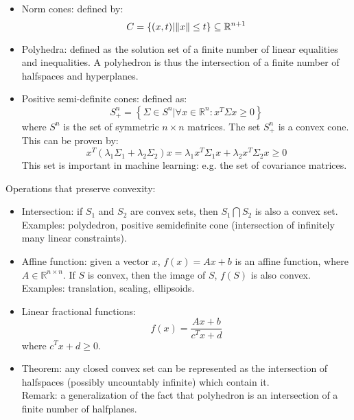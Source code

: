 \documentclass{report}
\begin{document}
\begin{itemize}
\item Norm cones: defined by: 
\begin{equation}
C	= \left\{(x,t) | \lVert x\rVert \leq t \right\} \subseteq \mathbb{R}^{n+1}
\end{equation}

\item Polyhedra: defined as the solution set of a finite number of linear equalities and inequalities. A polyhedron is thus the intersection of a finite number of halfspaces and hyperplanes. 

\item Positive semi-definite cones: defined as: 
\begin{equation}
S_{+}^n = \left\{ \Sigma \in S^n | \forall x \in \mathbb{R}^n: x^T \Sigma x \geq 0 \right\}	
\end{equation}
where $S^n$ is the set of symmetric $n \times n$ matrices. The set $S_{+}^n$ is a convex cone. This can be proven by: 
\begin{equation}
x^T (\lambda_1 \Sigma_1 + \lambda_2 \Sigma_2) x = \lambda_1 x^T \Sigma_1 x + \lambda_2 x^T \Sigma_2 x \geq 0
\end{equation}
This set is important in machine learning: e.g. the set of covariance matrices. 
\end{itemize}

Operations that preserve convexity: 
\begin{itemize}
\item Intersection: if $S_1$ and $S_2$ are convex sets, then $S_1 \bigcap S_2$ is also a convex set. Examples: polydedron, positive semidefinite cone (intersection of infinitely many linear constraints). 

\item Affine function: given a vector $x$, $f(x) = A x + b$ is an affine function, where $A \in \mathbb{R}^{n \times n}$. If $S$ is convex, then the image of $S$, $f(S)$ is also convex. Examples: translation, scaling, ellipsoids. 

\item Linear fractional functions: 
\begin{equation}
f(x) = \frac{Ax + b}{c^T x + d}	
\end{equation}
where $c^T x + d \geq 0$. 

\item Theorem: any closed convex set can be represented as the intersection of halfspaces (possibly uncountably infinite) which contain it. \\
Remark: a generalization of the fact that polyhedron is an intersection of a finite number of halfplanes. 
\end{itemize}
\end{document}
